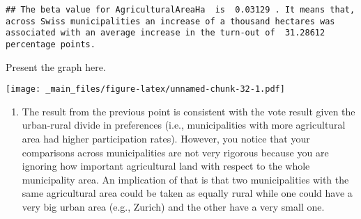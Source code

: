 \documentclass[
]{book}
\newenvironment{Shaded}{\begin{snugshade}}{\end{snugshade}}
\newcommand{\AttributeTok}[1]{\textcolor[rgb]{0.13,0.29,0.53}{#1}}
\newcommand{\CommentTok}[1]{\textcolor[rgb]{0.56,0.35,0.01}{\textit{#1}}}
\newcommand{\ConstantTok}[1]{\textcolor[rgb]{0.56,0.35,0.01}{#1}}
\newcommand{\DecValTok}[1]{\textcolor[rgb]{0.00,0.00,0.81}{#1}}
\newcommand{\FunctionTok}[1]{\textcolor[rgb]{0.13,0.29,0.53}{\textbf{#1}}}
\newcommand{\NormalTok}[1]{#1}
\newcommand{\SpecialCharTok}[1]{\textcolor[rgb]{0.81,0.36,0.00}{\textbf{#1}}}
\newcommand{\StringTok}[1]{\textcolor[rgb]{0.31,0.60,0.02}{#1}}
\providecommand{\tightlist}{%
  \setlength{\itemsep}{0pt}\setlength{\parskip}{0pt}}
\begin{document}
\begin{verbatim}
## The beta value for AgriculturalAreaHa  is  0.03129 . It means that, across Swiss municipalities an increase of a thousand hectares was associated with an average increase in the turn-out of  31.28612  percentage points.
\end{verbatim}

Present the graph here.

\begin{Shaded}
\end{Shaded}

\texttt{[image: \_main\_files/figure-latex/unnamed-chunk-32-1.pdf]}

\begin{enumerate}
\def\labelenumi{\roman{enumi}.}
\tightlist
\item
  The result from the previous point is consistent with the vote result given the urban-rural divide in preferences (i.e., municipalities with more agricultural area had higher participation rates). However, you notice that your comparisons across municipalities are not very rigorous because you are ignoring how important agricultural land with respect to the whole municipality area. An implication of that is that two municipalities with the same agricultural area could be taken as equally rural while one could have a very big urban area (e.g., Zurich) and the other have a very small one.
\end{enumerate}
\end{document}
